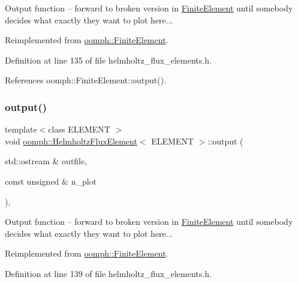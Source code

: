 Output function -- forward to broken version in \hyperlink{classoomph_1_1FiniteElement}{Finite\+Element} until somebody decides what exactly they want to plot here... 

Reimplemented from \hyperlink{classoomph_1_1FiniteElement_a2ad98a3d2ef4999f1bef62c0ff13f2a7}{oomph\+::\+Finite\+Element}.



Definition at line 135 of file helmholtz\+\_\+flux\+\_\+elements.\+h.



References oomph\+::\+Finite\+Element\+::output().

\mbox{\label{classoomph_1_1HelmholtzFluxElement_a8df42455a8d4584c1d67e8e0d7ab44a0}} 
\subsubsection{\texorpdfstring{output()}{output()}\hspace{0.1cm}{\footnotesize\ttfamily [2/4]}}
{\footnotesize\ttfamily template$<$class E\+L\+E\+M\+E\+NT $>$ \\
void \hyperlink{classoomph_1_1HelmholtzFluxElement}{oomph\+::\+Helmholtz\+Flux\+Element}$<$ E\+L\+E\+M\+E\+NT $>$\+::output (\begin{DoxyParamCaption}\item[{std\+::ostream \&}]{outfile,  }\item[{const unsigned \&}]{n\+\_\+plot }\end{DoxyParamCaption})\hspace{0.3cm}{\ttfamily [inline]}, {\ttfamily [virtual]}}



Output function -- forward to broken version in \hyperlink{classoomph_1_1FiniteElement}{Finite\+Element} until somebody decides what exactly they want to plot here... 



Reimplemented from \hyperlink{classoomph_1_1FiniteElement_afa9d9b2670f999b43e6679c9dd28c457}{oomph\+::\+Finite\+Element}.



Definition at line 139 of file helmholtz\+\_\+flux\+\_\+elements.\+h.



